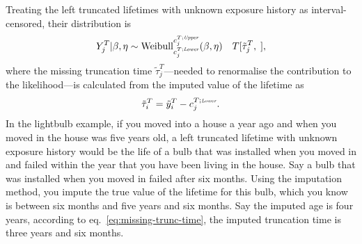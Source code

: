 Treating the left truncated lifetimes with unknown exposure history as interval-censored, their distribution is
\begin{equation}
    Y^T_j|\beta, \eta \sim \hbox{Weibull}^{c^{T;\textit{\tiny{Upper}}}_{j}}_{c^{T;\textit{\tiny{Lower}}}_{j}}(\beta, \eta) \quad T[\tilde{\tau}^{T}_j, \;],
\end{equation}
where the missing truncation time $\tilde{\tau}^{T}_j$---needed to renormalise the contribution to the likelihood---is calculated from the imputed value of the lifetime as
\begin{equation}
    \label{eq:missing-trunc-time}
   \tilde{\tau}^T_i = \tilde{y}^T_i - c^{T;\textit{\tiny{Lower}}}_{j}.
\end{equation}
In the lightbulb example, if you moved into a house a year ago and when you moved in the house was five years old, a left truncated lifetime with unknown exposure history would be the life of a bulb that was installed when you moved in and failed within the year that you have been living in the house. Say a bulb that was installed when you moved in failed after six months. Using the imputation method, you impute the true value of the lifetime for this bulb, which you know is between six months and five years and six months. Say the imputed age is four years, according to eq.~\eqref{eq:missing-trunc-time}, the imputed truncation time is three years and six months.

